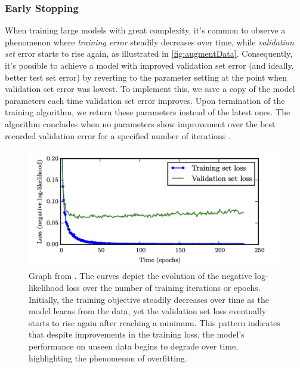 \documentclass{article}
\begin{document}
\subsubsection{Early Stopping}%
  \label{sub:Early Stopping}
When training large models with great complexity, it's common to observe a phenomenon where \textit{training error} steadily decreases over time, while \textit{validation set} error starts to rise again, as illustrated in \autoref{fig:augmentData}. Consequently, it's possible to achieve a model with improved validation set error (and ideally, better test set error) by reverting to the parameter setting at the point when validation set error was lowest. To implement this, we save a copy of the model parameters each time validation set error improves. Upon termination of the training algorithm, we return these parameters instead of the latest ones. The algorithm concludes when no parameters show improvement over the best recorded validation error for a specified number of iterations \citep{Goodfellow-et-al-2016}. 
\begin{figure}
\includegraphics{augmentData}
  \caption{Graph from \cite{Goodfellow-et-al-2016}. The curves depict the evolution of the negative log-likelihood loss over the number of training iterations or epochs. Initially, the training objective steadily decreases over time as the model learns from the data, yet the validation set loss eventually starts to rise again after reaching a minimum. This pattern indicates that despite improvements in the training loss, the model's performance on unseen data begins to degrade over time, highlighting the phenomenon of overfitting.}
  \label{fig:augmentData}
\end{figure}
\end{document}
